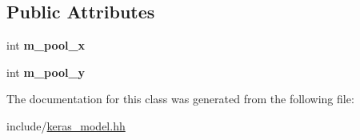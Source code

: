 \subsection*{Public Attributes}
\begin{DoxyCompactItemize}
\item 
\mbox{\label{classkeras_1_1_layer_max_pooling_a7cb2748c94a305ecfbd45bef2665f6c7}} 
int {\bfseries m\+\_\+pool\+\_\+x}
\item 
\mbox{\label{classkeras_1_1_layer_max_pooling_a8434bc2ef2f028ad86a7e8f6f22fd5a7}} 
int {\bfseries m\+\_\+pool\+\_\+y}
\end{DoxyCompactItemize}


The documentation for this class was generated from the following file\+:\begin{DoxyCompactItemize}
\item 
include/\mbox{\hyperlink{keras__model_8hh}{keras\+\_\+model.\+hh}}\end{DoxyCompactItemize}
